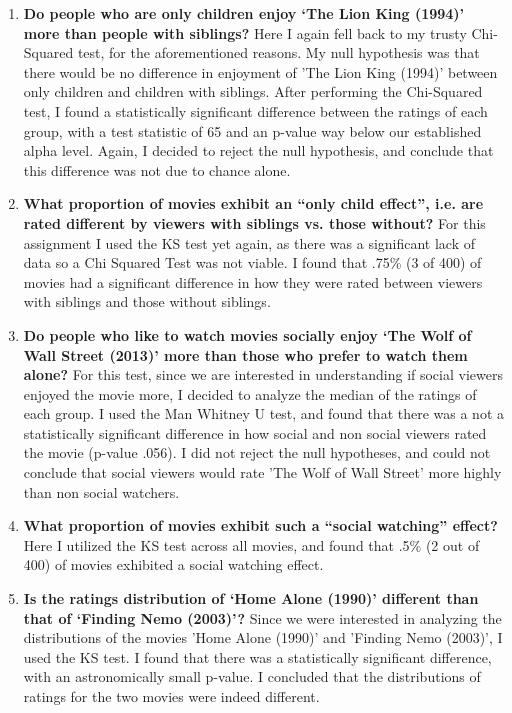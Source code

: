\documentclass[12pt,twoside]{article}
\begin{document}
\begin{enumerate}
    \item \textbf{ Do people who are only children enjoy ‘The Lion King (1994)’ more than people with siblings? }
    \subitem Here I again fell back to my trusty Chi-Squared test, for the aforementioned reasons. My null hypothesis was that there would be no difference in enjoyment of 'The Lion King (1994)' between only children and children with siblings. After performing the Chi-Squared test, I found a statistically significant difference between the ratings of each group, with a test statistic of 65 and an p-value way below our established alpha level. Again, I decided to reject the null hypothesis, and conclude that this difference was not due to chance alone. 
    \item \textbf{What proportion of movies exhibit an “only child effect”, i.e. are rated different by viewers with siblings vs. those without?}
    \subitem
    For this assignment I used the KS test yet again, as there was a significant lack of data so a Chi Squared Test was not viable. I found that .75\% (3 of 400) of movies had a significant difference in how they were rated between viewers with siblings and those without siblings.
    \item \textbf{Do people who like to watch movies socially enjoy ‘The Wolf of Wall Street (2013)’ more than those who prefer to watch them alone?}
    \subitem
    For this test, since we are interested in understanding if social viewers enjoyed the movie more, I decided to analyze the median of the ratings of each group. I used the Man Whitney U test, and found that there was a not a statistically significant difference in how social and non social viewers rated the movie (p-value .056). I did not reject the null hypotheses, and could not conclude that social viewers would rate 'The Wolf of Wall Street' more highly than non social watchers.
    \item \textbf{What proportion of movies exhibit such a “social watching” effect? }
    Here I utilized the KS test across all movies, and found that .5\% (2 out of 400) of movies exhibited a social watching effect.
    \item\textbf{ Is the ratings distribution of ‘Home Alone (1990)’ different than that of ‘Finding Nemo (2003)’? }
    \subitem
    Since we were interested in analyzing the distributions of the movies 'Home Alone (1990)' and 'Finding Nemo (2003)', I used the KS test. I found that there was a statistically significant difference, with an astronomically small p-value. I concluded that the distributions of ratings for the two movies were indeed different.

\end{enumerate}
\end{document}
